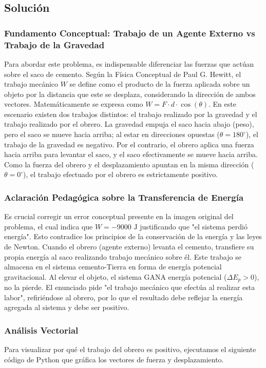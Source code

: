 \documentclass[12pt,a4paper]{article}
\begin{document}
\subsection*{Solución}

\subsubsection*{Fundamento Conceptual: Trabajo de un Agente Externo vs Trabajo de la Gravedad}
Para abordar este problema, es indispensable diferenciar las fuerzas que actúan sobre el saco de cemento. Según la Física Conceptual de Paul G. Hewitt, el trabajo mecánico $W$ se define como el producto de la fuerza aplicada sobre un objeto por la distancia que este se desplaza, considerando la dirección de ambos vectores. Matemáticamente se expresa como $W = F \cdot d \cdot \cos(\theta)$.
En este escenario existen dos trabajos distintos: el trabajo realizado por la gravedad y el trabajo realizado por el obrero. La gravedad empuja el saco hacia abajo (peso), pero el saco se mueve hacia arriba; al estar en direcciones opuestas ($\theta = 180^\circ$), el trabajo de la gravedad es negativo. Por el contrario, el obrero aplica una fuerza hacia arriba para levantar el saco, y el saco efectivamente se mueve hacia arriba. Como la fuerza del obrero y el desplazamiento apuntan en la misma dirección ($\theta = 0^\circ$), el trabajo efectuado por el obrero es estrictamente positivo.

\subsubsection*{Aclaración Pedagógica sobre la Transferencia de Energía}
Es crucial corregir un error conceptual presente en la imagen original del problema, el cual indica que $W = -9000 \text{ J}$ justificando que "el sistema perdió energía". Esto contradice los principios de la conservación de la energía y las leyes de Newton. Cuando el obrero (agente externo) levanta el cemento, transfiere su propia energía al saco realizando trabajo mecánico sobre él. Este trabajo se almacena en el sistema cemento-Tierra en forma de energía potencial gravitacional. Al elevar el objeto, el sistema GANA energía potencial ($\Delta E_p > 0$), no la pierde. El enunciado pide "el trabajo mecánico que efectúa al realizar esta labor", refiriéndose al obrero, por lo que el resultado debe reflejar la energía agregada al sistema y debe ser positivo.

\subsubsection*{Análisis Vectorial}
Para visualizar por qué el trabajo del obrero es positivo, ejecutamos el siguiente código de Python que gráfica los vectores de fuerza y desplazamiento. 
\end{document}
